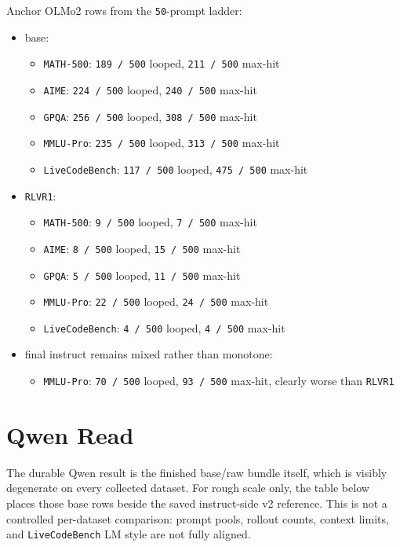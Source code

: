 \documentclass[11pt]{article}
\begin{document}
Anchor OLMo2 rows from the \texttt{50}-prompt ladder:
\begin{itemize}[leftmargin=1.5em]
\item base:
\begin{itemize}[leftmargin=1.5em]
\item \texttt{MATH-500}: \texttt{189 / 500} looped, \texttt{211 / 500} max-hit
\item \texttt{AIME}: \texttt{224 / 500} looped, \texttt{240 / 500} max-hit
\item \texttt{GPQA}: \texttt{256 / 500} looped, \texttt{308 / 500} max-hit
\item \texttt{MMLU-Pro}: \texttt{235 / 500} looped, \texttt{313 / 500} max-hit
\item \texttt{LiveCodeBench}: \texttt{117 / 500} looped, \texttt{475 / 500} max-hit
\end{itemize}
\item \texttt{RLVR1}:
\begin{itemize}[leftmargin=1.5em]
\item \texttt{MATH-500}: \texttt{9 / 500} looped, \texttt{7 / 500} max-hit
\item \texttt{AIME}: \texttt{8 / 500} looped, \texttt{15 / 500} max-hit
\item \texttt{GPQA}: \texttt{5 / 500} looped, \texttt{11 / 500} max-hit
\item \texttt{MMLU-Pro}: \texttt{22 / 500} looped, \texttt{24 / 500} max-hit
\item \texttt{LiveCodeBench}: \texttt{4 / 500} looped, \texttt{4 / 500} max-hit
\end{itemize}
\item final instruct remains mixed rather than monotone:
\begin{itemize}[leftmargin=1.5em]
\item \texttt{MMLU-Pro}: \texttt{70 / 500} looped, \texttt{93 / 500} max-hit, clearly worse than \texttt{RLVR1}
\end{itemize}
\end{itemize}

\section*{Qwen Read}
The durable Qwen result is the finished base/raw bundle itself, which is visibly degenerate on every collected dataset. For rough scale only, the table below places those base rows beside the saved instruct-side v2 reference. This is not a controlled per-dataset comparison: prompt pools, rollout counts, context limits, and \texttt{LiveCodeBench} LM style are not fully aligned.
\end{document}
